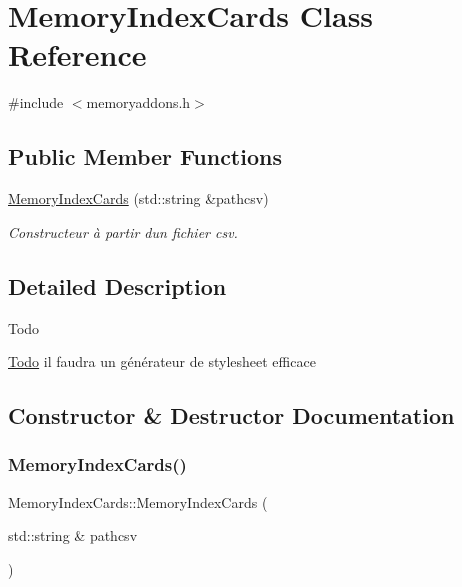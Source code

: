 \hypertarget{class_memory_index_cards}{}\section{Memory\+Index\+Cards Class Reference}
\label{class_memory_index_cards}


{\ttfamily \#include $<$memoryaddons.\+h$>$}

\subsection*{Public Member Functions}
\begin{DoxyCompactItemize}
\item 
\hyperlink{class_memory_index_cards_a10ae71958cd423edde68dc41dd010a66}{Memory\+Index\+Cards} (std\+::string \&pathcsv)
\begin{DoxyCompactList}\small\item\em Constructeur à partir d\textquotesingle{}un fichier csv. \end{DoxyCompactList}\end{DoxyCompactItemize}


\subsection{Detailed Description}
\begin{DoxyRefDesc}{Todo}
\item[\hyperlink{todo__todo000005}{Todo}]il faudra un générateur de stylesheet efficace \end{DoxyRefDesc}


\subsection{Constructor \& Destructor Documentation}
\mbox{\label{class_memory_index_cards_a10ae71958cd423edde68dc41dd010a66}} 
\subsubsection{\texorpdfstring{Memory\+Index\+Cards()}{MemoryIndexCards()}}
{\footnotesize\ttfamily Memory\+Index\+Cards\+::\+Memory\+Index\+Cards (\begin{DoxyParamCaption}\item[{std\+::string \&}]{pathcsv }\end{DoxyParamCaption})}



